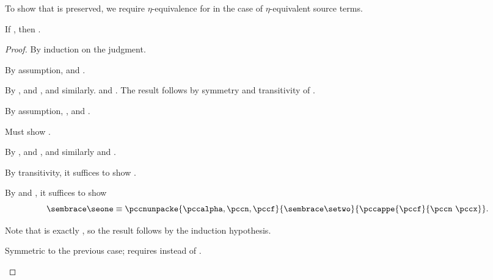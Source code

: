 To show that  is preserved, we require \(\eta\)-equivalence
for  in the case of \(\eta\)-equivalent source terms.
\begin{lemma}
  \label{lem:cc:pres-equiv}
  If \im{\sequivjudg{\slenv}{\se}{\sepr}}, then
  \im{\pccequivjudg{\cctrans{\slenv}}{\cctrans{\se}}{\seto{\sprime+}}}.
\end{lemma}
\begin{proof}
  By induction on the \im{\se \equiv \sepr} judgment.
  \begin{proofcases}
      \item {}
      By assumption, \im{\se \stepstar \seone} and \im{\sepr \stepstar \seone}.

      By , \im{\cctrans{\se} \stepstar \pcce} and
      \im{\pcce \equiv \cctrans{\seone}}, and similarly.
      \im{\cctrans{\sepr} \stepstar \pccepr} and \im{\pccepr \equiv \cctrans{\seone}}.
      The result follows by symmetry and transitivity of \im{\equiv}.
    \item {}
    By assumption, \im{\se \stepstar \sfune{\sx}{\st}{\seone}}, \im{\sepr \stepstar \setwo} and
    \im{\seone \equiv \sappe{\setwo}{\sx}}.

    Must show \im{\cctrans{\se} \equiv \cctrans{\sepr}}.

    By , \im{\cctrans{\se} \stepstar \pcce} and \im{\pcce \equiv
      \cctrans{\sfune{\sx}{\st}{\seone}}}, and similarly \im{\cctrans{\sepr} \stepstar \pccepr} and \im{\pccepr
      \equiv \cctrans{\setwo}}.

    By transitivity, it suffices to show \im{\cctrans{\sfune{\sx}{\st}{\seone}}
      \equiv \cctrans{\setwo}}.

    By  and
    , it suffices to show
    \begin{displaymath}
      \cctrans{\seone} \equiv
      {\pccnunpacke{\pccalpha,\pccn,\pccf}{\cctrans{\setwo}}{\pccappe{\pccf}{\pccn~\pccx}}}.
    \end{displaymath}

    Note that
    \im{\pccnunpacke{\pccalpha,\pccn,\pccf}{\cctrans{\setwo}}{\pccappe{\pccf}{\pccn~\pccx}}}
    is exactly \im{\cctrans{(\sappe{\setwo}{\sx})}}, so the result follows by the
    induction hypothesis.

    \item {}
    Symmetric to the previous case; requires
     instead of
    .
  \end{proofcases}
\end{proof}


